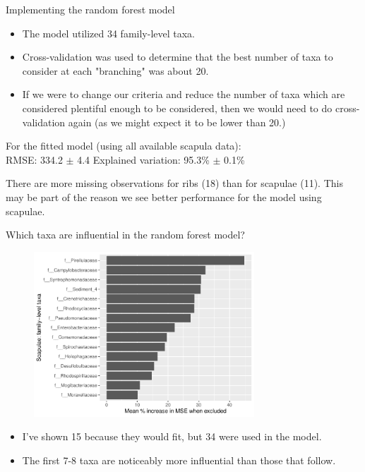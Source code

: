 \documentclass{beamer}
\begin{document}
\begin{frame}{Implementing the random forest model}

\begin{itemize}
\item The model utilized 34 family-level taxa.
\item Cross-validation was used to determine that the best number of taxa to
consider at each "branching" was about 20.
\item If we were to change our criteria and reduce the number of taxa which are
considered plentiful enough to be considered, then we would need to do
cross-validation again (as we might expect it to be lower than 20.)
\end{itemize}

\vspace{0.1in}

\noindent For the fitted model (using all available scapula data):\\
\noindent RMSE: 334.2 $\pm$ 4.4 \hspace{0.05in}  Explained variation: 95.3\%
$\pm$ 0.1\%

\vspace{0.1in}

\noindent There are more missing observations for ribs (18) than for scapulae
(11).  This may be part of the reason we see better performance for the model
using scapulae.

\end{frame}



\begin{frame}{Which taxa are influential in the random forest model?}

  \begin{center}
    \begin{figure}
      \includegraphics[width=3.25in]{use_families/w_scapulae/families_scapula_PercIncMSE_barchart}
    \end{figure}
  \end{center}
  \vspace{-0.1in}
  {\scriptsize
  \begin{itemize}
  \item I've shown 15 because they would fit, but 34 were used in the model.
  \item The first 7-8 taxa are noticeably more influential than those that
  follow.
  \end{itemize}
  }

\end{frame}
\end{document}
